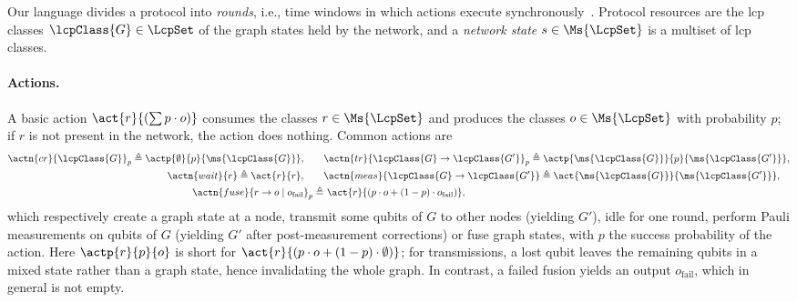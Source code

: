 
Our language divides a protocol into \emph{rounds}, i.e., time windows in which actions execute synchronously~\cite{buckley2024bellkat,buckley2025pbkat}.
Protocol resources are the \ac{lcp} classes $\lcpClass{G} \in \LcpSet$ of the graph states held by the network,
and a \emph{network state} $s \in \Ms{\LcpSet}$ is a multiset of \ac{lcp} classes.

\paragraph{Actions.}
A basic action $\act{r}{(\sum p \cdot o)}$ consumes the classes $r \in \Ms{\LcpSet}$ and produces the classes $o\in \Ms{\LcpSet}$ with probability $p$;
if $r$ is not present in the network, the action does nothing.
Common actions are
%
\[
\begin{aligned}
\actn{cr}{\lcpClass{G}}_p \triangleq \actp{\emptyset}{p}{\ms{\lcpClass{G}}}, \qquad &
\actn{tr}{\lcpClass{G} \to \lcpClass{G'}}_p \triangleq \actp{\ms{\lcpClass{G}}}{p}{\ms{\lcpClass{G'}}}, \\ 
\actn{wait}{r} \triangleq \act{r}{r}, \qquad &
\actn{meas}{\lcpClass{G} \to \lcpClass{G'}} \triangleq \act{\ms{\lcpClass{G}}}{\ms{\lcpClass{G'}}}, \\
\actn{fuse}{r \to o \mid o_{\mathrm{fail}}}_p \triangleq &\ \act{r}{(p \cdot o + (1-p) \cdot o_{\mathrm{fail}})}, \\
\end{aligned}
\]
%
which respectively create a graph state at a node, transmit some qubits of $G$ to other nodes (yielding $G'$), idle for one round, perform Pauli measurements on qubits of $G$ (yielding $G'$ after post-measurement corrections) or fuse graph states, with $p$ the success probability of the action.
Here $\actp{r}{p}{o}$ is short for $\act{r}{(p \cdot o + (1-p) \cdot \emptyset)}$;
for transmissions, a lost qubit leaves the remaining qubits in a mixed state rather than a graph state, hence invalidating the whole graph.
%
In contrast, a failed fusion yields an output $o_{\mathrm{fail}}$, which in general is not empty.

